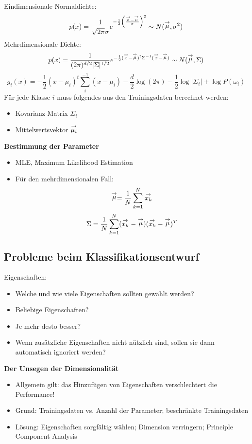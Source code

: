 Eindimensionale Normaldichte: $$p(x) = \frac{1}{\sqrt{2\pi} \sigma} e^{- \frac{1}{2} \left( \frac{\stackrel{\to}{x} - \stackrel{\to}{\mu}}{\sigma} \right)^2} \sim N(\stackrel{\to}{\mu},\sigma^2)$$
Mehrdimensionale Dichte: $$p(x) = \frac{1}{(2\pi)^{d/2}|\Sigma|^{1/2}}e^{- \frac{1}{2} ( \stackrel{\to}{x} - \stackrel{\to}{\mu})^t \Sigma^{-1} (\stackrel{\to}{x} - \stackrel{\to}{\mu}) } \sim N(\stackrel{\to}{\mu},\Sigma)$$
$$g_i(x) = - \frac{1}{2} (x - \mu_i)^t \sum_i^{-1} (x - \mu_i) - \frac{d}{2} \log(2\pi) - \frac{1}{2} \log|\Sigma_i| + \log P(\omega_i)$$
Für jede Klasse $i$ muss folgendes aus den Trainingsdaten berechnet werden:
\begin{itemize}
\item Kovarianz-Matrix $\Sigma_i$ \item Mittelwertsvektor $\stackrel{\to}{\mu_i}$
\end{itemize}
\textbf{Bestimmung der Parameter}
\begin{itemize}
\item MLE, Maximum Likelihood Estimation
\item Für den mehrdimensionalen Fall:
$$\stackrel{\to}{\mu} = \frac{1}{N} \sum\limits_{k=1}^N \stackrel{\to}{x_k}$$ $$\Sigma = \frac{1}{N} \sum\limits_{k=1}^N (\stackrel{\to}{x_k} - \stackrel{\to}{\mu})(\stackrel{\to}{x_k} - \stackrel{\to}{\mu})^T$$
\end{itemize}

\subsection{Probleme beim Klassifikationsentwurf}

Eigenschaften:
\begin{itemize}
\item Welche und wie viele Eigenschaften sollten gewählt werden?
\item Beliebige Eigenschaften?
\item Je mehr desto besser?
\item Wenn zusätzliche Eigenschaften nicht nützlich sind, sollen sie dann automatisch ignoriert werden?
\end{itemize}
\textbf{Der Unsegen der Dimensionalität}
\begin{itemize}
\item Allgemein gilt: das Hinzufügen von Eigenschaften verschlechtert die Performance!
\item Grund: Trainingsdaten vs. Anzahl der Parameter; beschränkte Trainingsdaten
\item Lösung: Eigenschaften sorgfältig wählen; Dimension verringern; Principle Component Analysis
\end{itemize}


